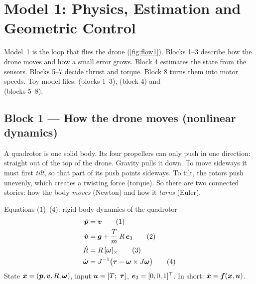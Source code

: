 \section{Model 1: Physics, Estimation and Geometric Control}
\label{sec:model1}

Model~1 is the loop that flies the drone (\cref{fig:flow1}). Blocks 1--3 describe how the drone moves and how a small
error grows. Block 4 estimates the state from the sensors. Blocks 5--7 decide thrust and torque. Block 8 turns them
into motor speeds. Toy model files:  (blocks 1--3),
 (block 4) and\\  (blocks 5--8).

\subsection{Block 1 --- How the drone moves (nonlinear dynamics)}
\label{sec:m1b1}

\begin{idea}
A quadrotor is one solid body. Its four propellers can only push in one direction: straight out of the top of
the drone. Gravity pulls it down. To move sideways it must first \emph{tilt}, so that part of its push points
sideways. To tilt, the rotors push unevenly, which creates a twisting force (torque). So there are two
connected stories: how the body \emph{moves} (Newton) and how it \emph{turns} (Euler).
\end{idea}

\begin{eqbox}{Equations (1)--(4): rigid-body dynamics of the quadrotor}
\begin{align}
  \dot{\bm{p}} &= \bm{v} \tag{1}\label{eq:1}\\
  \dot{\bm{v}} &= \bm{g} + \frac{T}{m}\,R\,\bm{e}_3 \tag{2}\label{eq:2}\\
  \dot{R}   &= R\,[\bm{\omega}]_{\times} \tag{3}\label{eq:3}\\
  \dot{\bm{\omega}} &= J^{-1}\big(\bm{\tau} - \bm{\omega}\times J\bm{\omega}\big) \tag{4}\label{eq:4}
\end{align}
State $\bm{x}=(\bm{p},\bm{v},R,\bm{\omega})$, input $\bm{u}=[T;\ \bm{\tau}]$, $\bm{e}_3=[0,0,1]^\top$. In short: $\dot{\bm{x}}=\bm{f}(\bm{x},\bm{u})$.
\end{eqbox}

